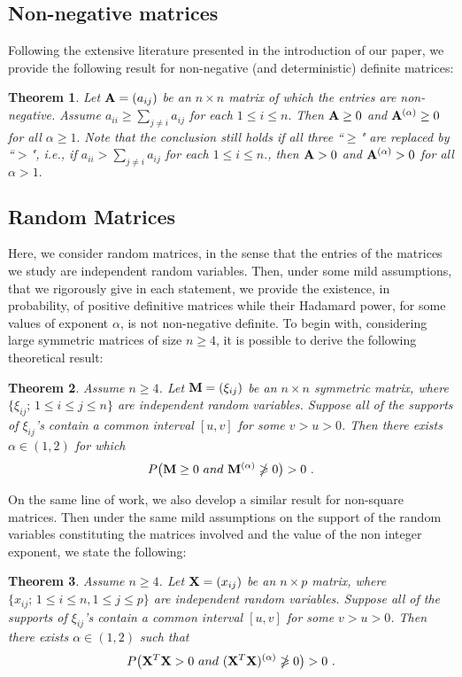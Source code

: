 \documentclass[conference,letterpaper]{IEEEtran}
\numberwithin{equation}{section}
\newcommand{\lbl}{\label}
\newcommand{\bd}{\bold}
\newcommand{\beaa}{\begin{eqnarray*}}
\newcommand{\eeaa}{\end{eqnarray*}}
\newtheorem{theorem}{{\sc Theorem}}[section]
\begin{document}
\subsection{Non-negative matrices}
Following the extensive literature presented in the introduction of our paper, we provide the following result for non-negative (and deterministic) definite matrices:

\begin{theorem}\lbl{my_country} Let $\bd{A}=(a_{ij})$ be an $n\times n$ matrix of which the entries are non-negative. Assume $a_{ii}\geq  \sum_{j\ne i}a_{ij}$ for each $1\leq i\leq n.$ Then $\bd{A} \geq 0$ and $\bd{A}^{(\alpha)}\geq  0$ for all $\alpha\geq 1.$ 
Note that the conclusion still holds if all three ``$\geq$" are replaced by ``$>$", \textit{i.e.}, if $a_{ii} >  \sum_{j\ne i}a_{ij}$ for each $1\leq i\leq n.$, then $\bd{A} > 0$ and $\bd{A}^{(\alpha)}>  0$ for all $\alpha> 1.$ 

\end{theorem}


\subsection{Random Matrices}
Here, we consider random matrices, in the sense that the entries of the matrices we study are independent random variables.
Then, under some mild assumptions, that we rigorously give in each statement, we provide the existence, in probability, of positive definitive matrices while their Hadamard power, for some values of exponent $\alpha$, is not non-negative definite.
To begin with, considering large symmetric matrices of size $n \geq 4$, it is possible to derive the following theoretical result:
\begin{theorem}\lbl{milk} Assume $n\geq 4$.   Let $\bd{M}=(\xi_{ij})$ be an $n\times n$ symmetric matrix, where $\{\xi_{ij};\, 1\leq i \leq j \leq n\}$ are independent random variables. 
Suppose all of the supports of $\xi_{ij}$'s contain  a common interval $[u, v]$ for some $v>u>0$. Then there exists $\alpha \in (1, 2)$ for which
\beaa
P\big(\bd{M}\geq 0\ \mbox{and}\ \bd{M}^{(\alpha)} \ngeqslant 0\big)>0 \ .
\eeaa
\end{theorem}

On the same line of work, we also develop a similar result for non-square matrices. Then under the same mild assumptions on the support of the random variables constituting the matrices involved and the value of the non integer exponent, we state the following:
\begin{theorem}\lbl{waffle} Assume $n\geq 4$.   Let $\bd{X}=(x_{ij})$ be an $n\times p$  matrix, where $\{x_{ij};\, 1\leq i \leq n, 1\leq j \leq p\}$ are independent random variables. Suppose all of the supports of $\xi_{ij}$'s contain  a common interval $[u, v]$ for some $v>u>0$. Then there exists $\alpha \in (1, 2)$ such that
\beaa
P\big(\bd{X}^T\bd{X}>0\ \mbox{and}\ (\bd{X}^T\bd{X})^{(\alpha)}\ngeqslant 0\big)>0 \ .
\eeaa
\end{theorem}
\end{document}
